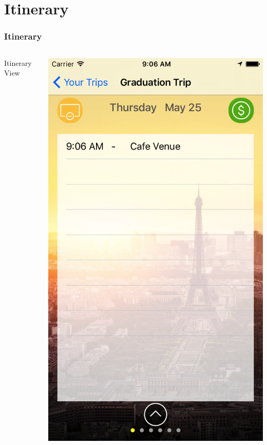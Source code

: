 \documentclass{beamer}
\begin{document}
\section{Itinerary}
\begin{frame}
\frametitle{Itinerary}
\begin{columns}
    \begin{column}{0.3\textwidth}
        Itinerary View
    \end{column}
    \begin{column}{0.3\textwidth}  %
        \begin{center}
            \includegraphics[scale=0.14]{itinerary1}

\end{center}
\end{column}
\end{columns}
\end{frame}
\end{document}
